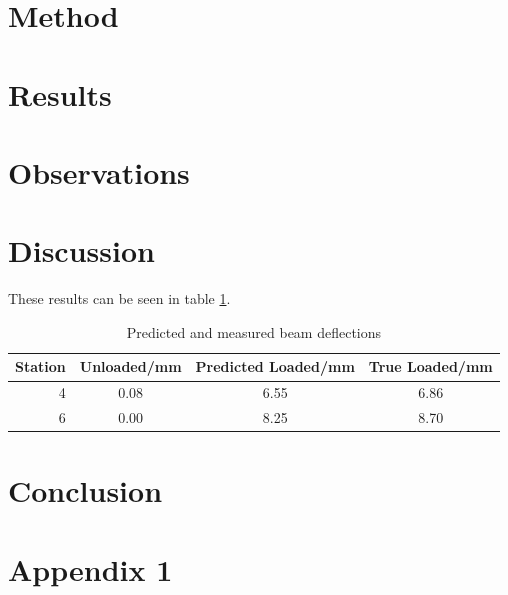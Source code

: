 \documentclass[11pt]{article}
\begin{document}
\section{Method}
	
\section{Results}
	
\section{Observations}
	
\section{Discussion}

    These results can be seen in table \ref{fig:myt}.
	
    \begin{table}
    \begin{center}
    \begin{tabular}{|r|c|c|c|}
        \hline Station & Unloaded/mm & Predicted Loaded/mm & True Loaded/mm \\
        \hline 4 & 0.08 & 6.55 & 6.86 \\
        \hline 6 & 0.00 & 8.25 & 8.70 \\
        \hline
    \end{tabular}
    \end{center}
    \caption{Predicted and measured beam deflections}
    \label{fig:myt}
    \end{table}
	
\section{Conclusion}

\appendix
\appendixpage
\addappheadtotoc
\section{Appendix 1}
			
\end{document}

